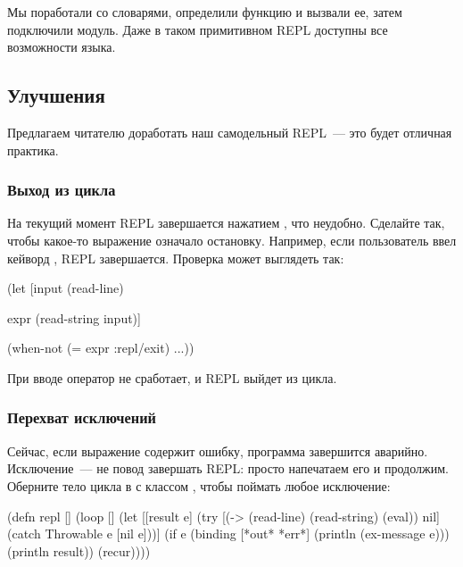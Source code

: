 Мы поработали со словарями, определили функцию и вызвали ее, затем подключили модуль. Даже в таком примитивном REPL доступны все возможности языка.

\subsection{Улучшения}

Предлагаем читателю доработать наш самодельный REPL~--- это будет отличная практика.

\subsubsection{Выход из цикла}

На текущий момент REPL завершается нажатием , что неудобно. Сделайте так, чтобы какое-то выражение означало остановку. Например, если пользователь ввел кейворд , REPL завершается. Проверка может выглядеть так:

\begin{english}
  \begin{clojure}
(let [input
      (read-line)

      expr
      (read-string input)]

  (when-not (= expr :repl/exit)
    ...))
  \end{clojure}
\end{english}

При вводе  оператор  не сработает, и REPL выйдет из цикла.

\subsubsection{Перехват исключений}

Сейчас, если выражение содержит ошибку, программа завершится аварийно. Исключение~--- не повод завершать REPL: просто напечатаем его и продолжим. Оберните тело цикла в  с классом , чтобы поймать любое исключение:

\begin{english}
  \begin{clojure/lines}
(defn repl []
  (loop []
    (let [[result e]
          (try
            [(-> (read-line)
                 (read-string)
                 (eval))
             nil]
            (catch Throwable e
              [nil e]))]
      (if e
        (binding [*out* *err*]
          (println (ex-message e)))
        (println result))
      (recur))))
  \end{clojure/lines}
\end{english}

